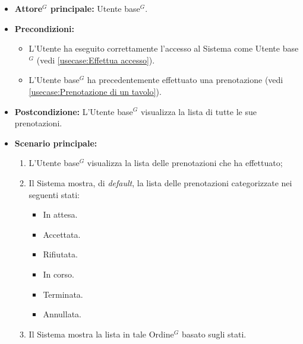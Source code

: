 \label{usecase:Visualizzazione lista delle prenotazioni}
\begin{itemize}
	\item \textbf{\gls{Attore}$^G$ principale:} \gls{Utente base}$^G$.

	\item \textbf{Precondizioni:}
	      \begin{itemize}
		      \item L'Utente ha eseguito correttamente l'accesso al Sistema come \gls{Utente base}$^G$ (vedi \autoref{usecase:Effettua accesso}).
		      \item L'\gls{Utente base}$^G$ ha precedentemente effettuato una prenotazione (vedi \autoref{usecase:Prenotazione di un tavolo}).
	      \end{itemize}


	\item \textbf{Postcondizione:}
	      L'\gls{Utente base}$^G$ visualizza la lista di tutte le sue prenotazioni.

	\item \textbf{Scenario principale:}
	      \begin{enumerate}
		      \item L'\gls{Utente base}$^G$ visualizza la lista delle prenotazioni che ha effettuato;
		      \item Il Sistema mostra, di \textit{default}, la lista delle prenotazioni categorizzate nei seguenti stati:
		            \begin{itemize}
			            \item In attesa.
			            \item Accettata.
			            \item Rifiutata.
			            \item In corso.
			            \item Terminata.
			            \item Annullata.
		            \end{itemize}
		      \item Il Sistema mostra la lista in tale \gls{Ordine}$^G$ basato sugli stati.
	      \end{enumerate}
\end{itemize}
